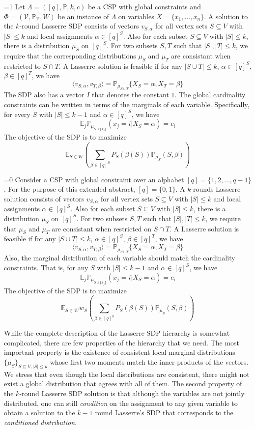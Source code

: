 \documentclass[11pt]{article}
\def\full{1}
\theoremstyle{definition}
\renewcommand{\leq}{\leqslant}
\numberwithin{equation}{section}
\newcommand{\sse}{\subseteq}
\begin{document}
\ifnum\full=1
Let $\Lambda=([q],\mathbb{P},k,c)$ be a CSP with global constraints
and $\Phi=(\mathcal{V},\mathbb{P}_{\mathcal{V}},W)$ be an instance of
$\Lambda$ on variables $X=\{x_1,...,x_n\}$. A solution to the
$k$-round Lasserre SDP consists of vectors $v_{S,\alpha}$ for all
vertex sets $S\subseteq V$ with $|S|\leq k$ and local assignments
$\alpha\in [q]^{S}$. Also for each subset $S\subseteq V$ with $|S|\leq
k$, there is a distribution $\mu_S$ on $[q]^{S}$. For two subsets
$S,T$ such that $|S|,|T|\leq k$, we require that the corresponding
distributions $\mu_S$ and $\mu_T$ are consistant when restricted to $S\cap T$. A Lasserre solution is feasible if for any $|S\cup T|\leq k$, $\alpha\in [q]^S$, $\beta\in [q]^T$, we have
$$
\langle v_{S,\alpha},v_{T,\beta}\rangle =\mathbb{P}_{\mu_{S\cup T}}\{X_S=\alpha, X_T=\beta\}
$$
The SDP also has a vector $I$ that denotes the constant $1$.  The global cardinality constraints can be written in terms of the
marginals of each variable. Specifically, for every $S$ with $|S|\leq k-1$ and $\alpha\in [q]^{S}$, we have
$$
\mathbb{E}_j \mathbb{P}_{\mu_{S\cup \{x_j\}}} (x_j=i | X_S=\alpha)=c_i
$$
The objective of the SDP is to maximize
$$
\mathbb{E}_{S\in W}\left(\sum_{\beta\in[q]^{S}}
P_S(\beta(S))\mathbb{P}_{\mu_S}(S,\beta)\right)
$$


\fi
\ifnum\full=0
Consider a CSP with global constraint over an alphabet $[q] =
\{1,2,\ldots,q-1\}$.  For the purpose of this extended abstract, $[q]
= \{0,1\}$.
A $k$-rounds Lasserre solution consists of vectors $v_{S,\alpha}$ for
all vertex sets $S\subseteq V$ with $|S|\leq k$ and local assignments
$\alpha\in [q]^{S}$. Also for each subset $S\subseteq V$ with $|S|\leq k$, there is a distribution $\mu_S$ on $[q]^{S}$. For two subsets $S,T$ such that $|S|,|T|\leq k$, we require that $\mu_S$ and $\mu_T$ are consistant when restricted on $S\cap T$. A Lasserre solution is feasible if for any $|S\cup T|\leq k$, $\alpha\in [q]^S$, $\beta\in [q]^T$, we have
$$
\langle v_{S,\alpha},v_{T,\beta}\rangle =\mathbb{P}_{\mu_{S\cup T}}\{X_S=\alpha, X_T=\beta\}
$$
Also, the marginal distribution of each variable should match the cardinality constraints. That is, for any $S$ with $|S|\leq k-1$ and $\alpha\in [q]^{S}$, we have
$$
\mathbb{E}_j \mathbb{P}_{\mu_{S\cup \{x_j\}}} (x_j=i | X_S=\alpha)=c_i
$$
The objective of the SDP is to maximize
$$
\mathbb{E}_{S\in W}w_{S}(\sum_{\beta\in[q]^{S}} P_S(\beta(S))\mathbb{P}_{\mu_S}(S,\beta))
$$
\fi


While the complete description of the Lasserre SDP hierarchy is
somewhat complicated, there are few properties of the hierarchy that
we need. The most
important property is the existence of consistent local
marginal distributions $\{\mu_{S}\}_{S \sse V,|S| \leq k}$ whose first two
moments match the inner products of the vectors. We
stress that even though the local distributions are consistent, there
might not exist a global distribution that agrees with all of them.  The second property of the $k$-round Lasserre SDP
solution is that although the variables are not jointly distributed,
one can still \emph{condition} on the assignment to any given
variable to obtain a solution to the $k-1$ round Lasserre's SDP that
corresponds to the \emph{conditioned distribution}.
\end{document}
